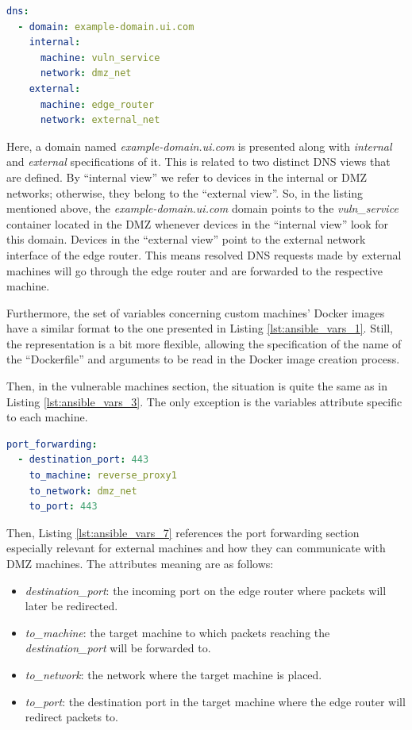 \begin{lstlisting}[language=yaml,caption=Ansible Variables - DNS.,numbers=none,label={lst:ansible_vars_4}]
dns:
  - domain: example-domain.ui.com
    internal:
      machine: vuln_service
      network: dmz_net
    external:
      machine: edge_router
      network: external_net
\end{lstlisting}

Here, a domain named \textit{example-domain.ui.com} is presented along with \textit{internal} and \textit{external} specifications of it. This is related to two distinct DNS views that are defined. By ``internal view'' we refer to devices in the internal or DMZ networks; otherwise, they belong to the ``external view''. So, in the listing mentioned above, the \textit{example-domain.ui.com} domain points to the \textit{vuln\_service} container located in the DMZ whenever devices in the ``internal view'' look for this domain. Devices in the ``external view'' point to the external network interface of the edge router. This means resolved DNS requests made by external machines will go through the edge router and are forwarded to the respective machine. 

Furthermore, the set of variables concerning custom machines' Docker images have a similar format to the one presented in Listing \ref{lst:ansible_vars_1}. Still, the representation is a bit more flexible, allowing the specification of the name of the ``Dockerfile'' and arguments to be read in the Docker image creation process.

Then, in the vulnerable machines section, the situation is quite the same as in Listing \ref{lst:ansible_vars_3}. The only exception is the variables attribute specific to each machine.

\begin{lstlisting}[language=yaml,caption=Ansible Variables - Port Forwarding.,numbers=none,label={lst:ansible_vars_7}]
port_forwarding:
  - destination_port: 443
    to_machine: reverse_proxy1
    to_network: dmz_net
    to_port: 443
\end{lstlisting}

Then, Listing \ref{lst:ansible_vars_7} references the port forwarding section especially relevant for external machines and how they can communicate with DMZ machines. The attributes meaning are as follows: 

\begin{itemize}
    \item \textit{destination\_port}: the incoming port on the edge router where packets will later be redirected.
    \item \textit{to\_machine}: the target machine to which packets reaching the \textit{destination\_port} will be forwarded to.
    \item \textit{to\_network}: the network where the target machine is placed.
    \item \textit{to\_port}: the destination port in the target machine where the edge router will redirect packets to.
\end{itemize}

